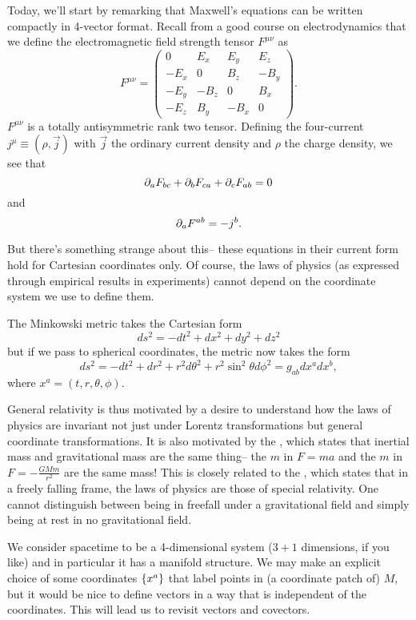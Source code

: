 Today, we'll start by remarking that Maxwell's equations can be written compactly in 4-vector format. Recall from a good course on electrodynamics that we define the electromagnetic field strength tensor $F^{\mu\nu}$ as
$$F^{\mu\nu}=\begin{pmatrix}
0& E_x & E_y & E_z\\
-E_x & 0 & B_z & - B_y\\
-E_y & -B_z & 0 & B_x\\
-E_z & B_y & -B_x & 0
\end{pmatrix}.$$
$F^{\mu\nu}$ is a totally antisymmetric rank two tensor. Defining the four-current $j^\mu \equiv(\rho, \vec{j})$ with $\vec{j}$ the ordinary current density and $\rho$ the charge density, we see that
$$\partial_a F_{bc} +\partial_b F_{ca} +\partial_c F_{ab}=0$$
and
$$\partial_a F^{ab}=-j^b.$$

But there's something strange about this-- these equations in their current form hold for Cartesian coordinates only. Of course, the laws of physics (as expressed through empirical results in experiments) cannot depend on the coordinate system we use to define them. 
\begin{exm}
The Minkowski metric takes the Cartesian form
$$ds^2=-dt^2+dx^2+dy^2+dz^2$$
but if we pass to spherical coordinates, the metric now takes the form 
$$ds^2=-dt^2+dr^2+r^2d\theta^2 +r^2 \sin^2 \theta d\phi^2=g_{ab}dx^a dx^b,$$
where $x^a=(t,r,\theta,\phi).$
\end{exm}

General relativity is thus motivated by a desire to understand how the laws of physics are invariant not just under Lorentz transformations but general coordinate transformations. It is also motivated by the , which states that inertial mass and gravitational mass are the same thing-- the $m$ in $F=ma$ and the $m$ in $F=-\frac{GMm }{r^2}$ are the same mass! This is closely related to the , which states that in a freely falling frame, the laws of physics are those of special relativity. One cannot distinguish between being in freefall under a gravitational field and simply being at rest in no gravitational field.

We consider spacetime to be a 4-dimensional system ($3+1$ dimensions, if you like) and in particular it has a manifold structure. We may make an explicit choice of some coordinates $\{x^a\}$ that label points in (a coordinate patch of) $M$, but it would be nice to define vectors in a way that is independent of the coordinates. This will lead us to revisit vectors and covectors.


